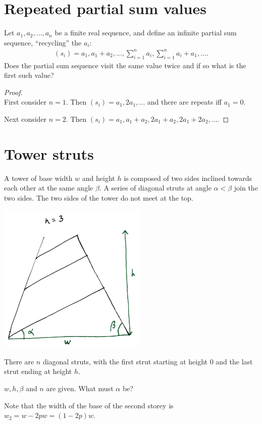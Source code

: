 \documentclass[12pt]{article}
\begin{document}
\section{Repeated partial sum values}

\begin{mdframed}
  Let $a_1, a_2, \ldots, a_n$ be a finite real sequence, and define an infinite partial sum
  sequence, ``recycling'' the $a_i$:
  \begin{align*}
    (s_i) = a_1, a_1 + a_2, \ldots, \sum_{i=1}^na_i, \sum_{i=1}^na_i + a_1, \ldots.
  \end{align*}
  Does the partial sum sequence visit the same value twice and if so what is the first such value?
\end{mdframed}


\begin{proof}~\\
  First consider $n = 1$. Then $(s_i) = a_1, 2a_1, \ldots$ and there are repeats iff $a_1 = 0$.

  Next consider $n = 2$. Then $(s_i) = a_1, a_1 + a_2, 2a_1 + a_2, 2a_1 + 2a_2, \ldots$.
\end{proof}
\section*{Tower struts}

\begin{mdframed}
  A tower of base width $w$ and height $h$ is composed of two sides inclined towards each other at
  the same angle $\beta$. A series of diagonal struts at angle $\alpha < \beta$ join the two
  sides. The two sides of the tower do not meet at the top.

  \includegraphics[width=200pt]{img/puzzles-tower-struts.png}

  There are $n$ diagonal struts, with the first strut starting at height 0 and the last strut
  ending at height $h$.

  $w, h, \beta$ and $n$ are given. What must $\alpha$ be?
\end{mdframed}
Note that the width of the base of the second storey is $w_2 = w - 2pw = (1 - 2p)w$.
\end{document}
